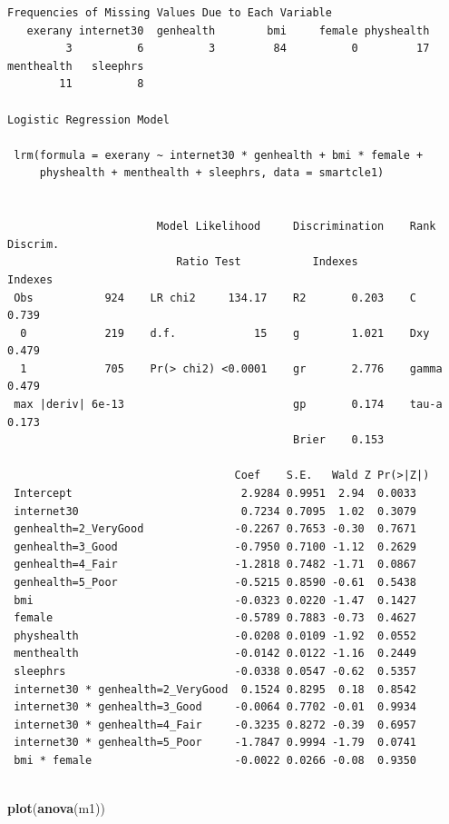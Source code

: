 \documentclass[]{book}
\newenvironment{Shaded}{\begin{snugshade}}{\end{snugshade}}
\newcommand{\KeywordTok}[1]{\textcolor[rgb]{0.13,0.29,0.53}{\textbf{#1}}}
\newcommand{\NormalTok}[1]{#1}
\theoremstyle{definition}
\theoremstyle{definition}
\theoremstyle{definition}
\theoremstyle{remark}
\begin{document}
\begin{verbatim}
Frequencies of Missing Values Due to Each Variable
   exerany internet30  genhealth        bmi     female physhealth 
         3          6          3         84          0         17 
menthealth   sleephrs 
        11          8 

Logistic Regression Model
 
 lrm(formula = exerany ~ internet30 * genhealth + bmi * female + 
     physhealth + menthealth + sleephrs, data = smartcle1)
 
 
                       Model Likelihood     Discrimination    Rank Discrim.    
                          Ratio Test           Indexes           Indexes       
 Obs           924    LR chi2     134.17    R2       0.203    C       0.739    
  0            219    d.f.            15    g        1.021    Dxy     0.479    
  1            705    Pr(> chi2) <0.0001    gr       2.776    gamma   0.479    
 max |deriv| 6e-13                          gp       0.174    tau-a   0.173    
                                            Brier    0.153                     
 
                                   Coef    S.E.   Wald Z Pr(>|Z|)
 Intercept                          2.9284 0.9951  2.94  0.0033  
 internet30                         0.7234 0.7095  1.02  0.3079  
 genhealth=2_VeryGood              -0.2267 0.7653 -0.30  0.7671  
 genhealth=3_Good                  -0.7950 0.7100 -1.12  0.2629  
 genhealth=4_Fair                  -1.2818 0.7482 -1.71  0.0867  
 genhealth=5_Poor                  -0.5215 0.8590 -0.61  0.5438  
 bmi                               -0.0323 0.0220 -1.47  0.1427  
 female                            -0.5789 0.7883 -0.73  0.4627  
 physhealth                        -0.0208 0.0109 -1.92  0.0552  
 menthealth                        -0.0142 0.0122 -1.16  0.2449  
 sleephrs                          -0.0338 0.0547 -0.62  0.5357  
 internet30 * genhealth=2_VeryGood  0.1524 0.8295  0.18  0.8542  
 internet30 * genhealth=3_Good     -0.0064 0.7702 -0.01  0.9934  
 internet30 * genhealth=4_Fair     -0.3235 0.8272 -0.39  0.6957  
 internet30 * genhealth=5_Poor     -1.7847 0.9994 -1.79  0.0741  
 bmi * female                      -0.0022 0.0266 -0.08  0.9350  
 
\end{verbatim}

\begin{Shaded}
\begin{Highlighting}[]
\KeywordTok{plot}\NormalTok{(}\KeywordTok{anova}\NormalTok{(m1))}
\end{Highlighting}
\end{Shaded}
\end{document}
